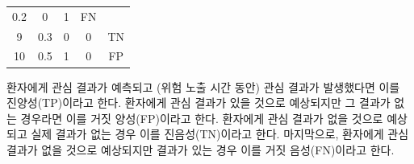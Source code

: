 \documentclass[11pt]{book}
\theoremstyle{definition}
\theoremstyle{definition}
\theoremstyle{definition}
\theoremstyle{remark}
\begin{document}
\begin{longtable}[]{@{}ccccc@{}}
\begin{minipage}[t]{0.14\columnwidth}
0.2\strut
\end{minipage} & \begin{minipage}[t]{0.14\columnwidth}\centering\strut
0\strut
\end{minipage} & \begin{minipage}[t]{0.14\columnwidth}\centering\strut
1\strut
\end{minipage} & \begin{minipage}[t]{0.11\columnwidth}\centering\strut
FN\strut
\end{minipage}\tabularnewline
\begin{minipage}[t]{0.12\columnwidth}\centering\strut
9\strut
\end{minipage} & \begin{minipage}[t]{0.14\columnwidth}\centering\strut
0.3\strut
\end{minipage} & \begin{minipage}[t]{0.14\columnwidth}\centering\strut
0\strut
\end{minipage} & \begin{minipage}[t]{0.14\columnwidth}\centering\strut
0\strut
\end{minipage} & \begin{minipage}[t]{0.11\columnwidth}\centering\strut
TN\strut
\end{minipage}\tabularnewline
\begin{minipage}[t]{0.12\columnwidth}\centering\strut
10\strut
\end{minipage} & \begin{minipage}[t]{0.14\columnwidth}\centering\strut
0.5\strut
\end{minipage} & \begin{minipage}[t]{0.14\columnwidth}\centering\strut
1\strut
\end{minipage} & \begin{minipage}[t]{0.14\columnwidth}\centering\strut
0\strut
\end{minipage} & \begin{minipage}[t]{0.11\columnwidth}\centering\strut
FP\strut
\end{minipage}\tabularnewline
\bottomrule
\end{longtable}

환자에게 관심 결과가 예측되고 (위험 노출 시간 동안) 관심 결과가
발생했다면 이를 진양성(TP)이라고 한다. 환자에게 관심 결과가 있을 것으로
예상되지만 그 결과가 없는 경우라면 이를 거짓 양성(FP)이라고 한다.
환자에게 관심 결과가 없을 것으로 예상되고 실제 결과가 없는 경우 이를
진음성(TN)이라고 한다. 마지막으로, 환자에게 관심 결과가 없을 것으로
예상되지만 결과가 있는 경우 이를 거짓 음성(FN)이라고
한다.  
\end{document}
